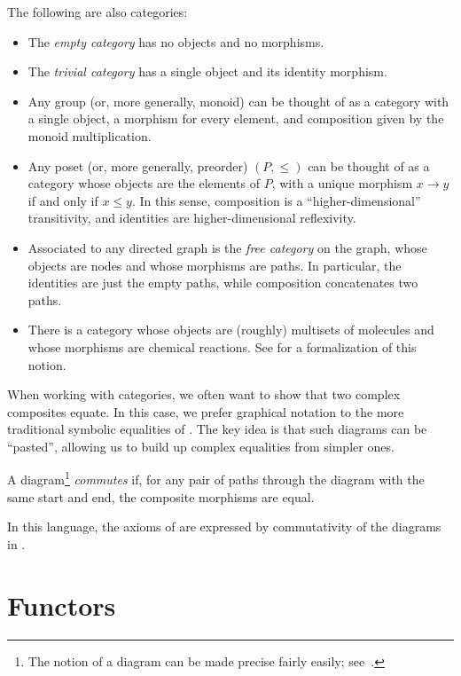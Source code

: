 \begin{ex}\label{ex:abstract categories}The following are also categories:
	\begin{itemize}
		\item The \emph{empty category} has no objects and no morphisms.
		\item The \emph{trivial category} has a single object and its identity morphism.
		\item Any group (or, more generally, monoid) can be thought of as a category
		      with a single object, a morphism for every element, and composition
		      given by the monoid multiplication.
		\item Any poset (or, more generally, preorder) $(P, \leq)$ can be thought
		      of as a category whose objects are the elements of $P$, with a unique
		      morphism $x\rightarrow y$ if and only if $x\leq y$. In this sense,
		      composition is a ``higher-dimensional'' transitivity, and identities are
		      higher-dimensional reflexivity.
		\item Associated to any directed graph is the \emph{free category} on the
		      graph, whose objects are nodes and whose morphisms are paths. In
          particular, the identities are just the empty paths, while composition
          concatenates two paths.
		\item There is a category whose objects are (roughly) multisets of molecules
		      and whose morphisms are chemical reactions. See \cite{baez-2017} for a
		      formalization of this notion.
	\end{itemize}
\end{ex}


\noindent
When working with categories, we often want to show that two complex composites
equate. In this case, we prefer graphical notation to the more traditional
symbolic equalities of . The key idea is that such diagrams
can be ``pasted'', allowing us to build up complex equalities from simpler ones.

\begin{dfn}\label{def:commutative diagram}
	A diagram\footnote{The notion of a diagram can be made precise fairly easily;
		see~\cite[Section 1.6]{riehl-2017}.} \emph{commutes} if, for any pair of paths
	through the diagram with the same start and end, the composite morphisms are
	equal.
\end{dfn}

\begin{ex}
	In this language, the axioms of  are expressed by commutativity of the
	diagrams in .
\end{ex}

\section{Functors}


